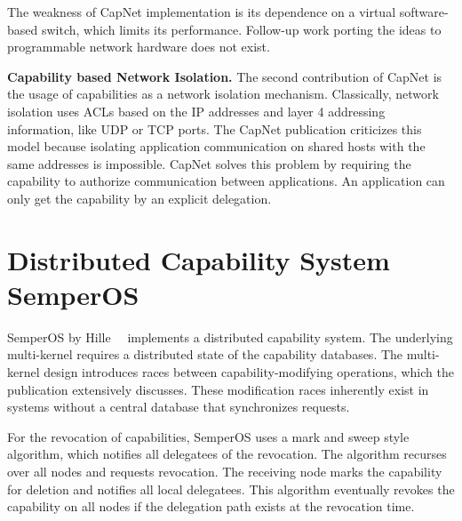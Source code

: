 The weakness of CapNet implementation is its dependence on a virtual software-based switch, which limits its performance. Follow-up work porting the ideas to programmable network hardware does not exist.

%  

\textbf{Capability based Network Isolation.}
The second contribution of CapNet is the usage of capabilities as a network isolation mechanism. Classically, network isolation uses \acp{ACL} based on the \ac{IP} addresses and layer 4 addressing information, like \ac{UDP} or \ac{TCP} ports. The CapNet publication criticizes this model because isolating application communication on shared hosts with the same addresses is impossible. CapNet solves this problem by requiring the capability to authorize communication between applications. An application can only get the capability by an explicit delegation.

\section{Distributed Capability System SemperOS}
SemperOS by Hille~\etal{}\@~\cite{hilleSemperOSDistributedCapability2019} implements a distributed capability system. The underlying multi-kernel requires a distributed state of the capability databases. The multi-kernel design introduces races between capability-modifying operations, which the publication extensively discusses. These modification races inherently exist in systems without a central database that synchronizes requests.

For the revocation of capabilities, SemperOS uses a mark and sweep style algorithm, which notifies all delegatees of the revocation. The algorithm recurses over all nodes and requests revocation. The receiving node marks the capability for deletion and notifies all local delegatees. This algorithm eventually revokes the capability on all nodes if the delegation path exists at the revocation time.

